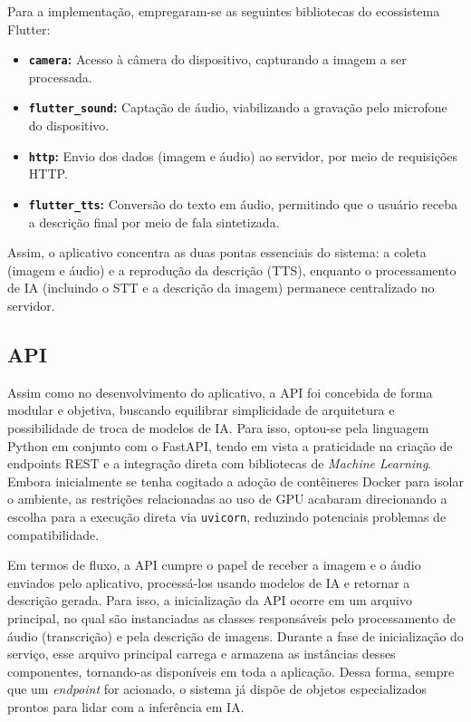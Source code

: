 Para a implementação, empregaram-se as seguintes bibliotecas do ecossistema Flutter:

\begin{itemize}
    \item \textbf{\texttt{camera}:} Acesso à câmera do dispositivo, capturando a imagem a ser processada.
    \item \textbf{\texttt{flutter\_sound}:} Captação de áudio, viabilizando a gravação pelo microfone do dispositivo.
    \item \textbf{\texttt{http}:} Envio dos dados (imagem e áudio) ao servidor, por meio de requisições HTTP.
    \item \textbf{\texttt{flutter\_tts}:} Conversão do texto em áudio, permitindo que o usuário receba a descrição final por meio de fala sintetizada.
\end{itemize}

Assim, o aplicativo concentra as duas pontas essenciais do sistema: a coleta (imagem e áudio) e a reprodução da descrição (TTS), enquanto o processamento de IA (incluindo o STT e a descrição da imagem) permanece centralizado no servidor.

\subsection{API}

Assim como no desenvolvimento do aplicativo, a API foi concebida de forma modular e objetiva, buscando equilibrar simplicidade de arquitetura e possibilidade de troca de modelos de IA. Para isso, optou-se pela linguagem Python em conjunto com o FastAPI, tendo em vista a praticidade na criação de endpoints REST e a integração direta com bibliotecas de \textit{Machine Learning}. Embora inicialmente se tenha cogitado a adoção de contêineres Docker para isolar o ambiente, as restrições relacionadas ao uso de GPU acabaram direcionando a escolha para a execução direta via \texttt{uvicorn}, reduzindo potenciais problemas de compatibilidade.

Em termos de fluxo, a API cumpre o papel de receber a imagem e o áudio enviados pelo aplicativo, processá-los usando modelos de IA e retornar a descrição gerada. Para isso, a inicialização da API ocorre em um arquivo principal, no qual são instanciadas as classes responsáveis pelo processamento de áudio (transcrição) e pela descrição de imagens. Durante a fase de inicialização do serviço, esse arquivo principal carrega e armazena as instâncias desses componentes, tornando-as disponíveis em toda a aplicação. Dessa forma, sempre que um \textit{endpoint} for acionado, o sistema já dispõe de objetos especializados prontos para lidar com a inferência em IA.

